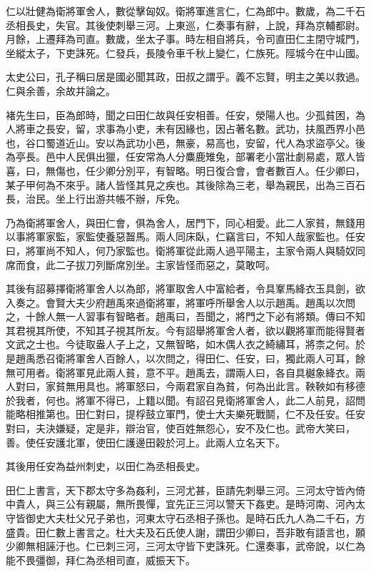 仁以壯健為衛將軍舍人，數從擊匈奴。衛將軍進言仁，仁為郎中。數歲，為二千石丞相長史，失官。其後使刺舉三河。上東巡，仁奏事有辭，上說，拜為京輔都尉。月餘，上遷拜為司直。數歲，坐太子事。時左相自將兵，令司直田仁主閉守城門，坐縱太子，下吏誅死。仁發兵，長陵令車千秋上變仁，仁族死。陘城今在中山國。

太史公曰，孔子稱曰居是國必聞其政，田叔之謂乎。義不忘賢，明主之美以救過。仁與余善，余故并論之。

褚先生曰，臣為郎時，聞之曰田仁故與任安相善。任安，滎陽人也。少孤貧困，為人將車之長安，留，求事為小吏，未有因緣也，因占著名數。武功，扶風西界小邑也，谷口蜀道近山。安以為武功小邑，無豪，易高也，安留，代人為求盜亭父。後為亭長。邑中人民俱出獵，任安常為人分麋鹿雉兔，部署老小當壯劇易處，眾人皆喜，曰，無傷也，任少卿分別平，有智略。明日復合會，會者數百人。任少卿曰，某子甲何為不來乎。諸人皆怪其見之疾也。其後除為三老，舉為親民，出為三百石長，治民。坐上行出游共帳不辦，斥免。

乃為衛將軍舍人，與田仁會，俱為舍人，居門下，同心相愛。此二人家貧，無錢用以事將軍家監，家監使養惡齧馬。兩人同床臥，仁竊言曰，不知人哉家監也。任安曰，將軍尚不知人，何乃家監也。衛將軍從此兩人過平陽主，主家令兩人與騎奴同席而食，此二子拔刀列斷席別坐。主家皆怪而惡之，莫敢呵。

其後有詔募擇衛將軍舍人以為郎，將軍取舍人中富給者，令具鞌馬絳衣玉具劍，欲入奏之。會賢大夫少府趙禹來過衛將軍，將軍呼所舉舍人以示趙禹。趙禹以次問之，十餘人無一人習事有智略者。趙禹曰，吾聞之，將門之下必有將類。傳曰不知其君視其所使，不知其子視其所友。今有詔舉將軍舍人者，欲以觀將軍而能得賢者文武之士也。今徒取盎人子上之，又無智略，如木偶人衣之綺繡耳，將柰之何。於是趙禹悉召衛將軍舍人百餘人，以次問之，得田仁、任安，曰，獨此兩人可耳，餘無可用者。衛將軍見此兩人貧，意不平。趙禹去，謂兩人曰，各自具樾象絳衣。兩人對曰，家貧無用具也。將軍怒曰，今兩君家自為貧，何為出此言。鞅鞅如有移德於我者，何也。將軍不得已，上籍以聞。有詔召見衛將軍舍人，此二人前見，詔問能略相推第也。田仁對曰，提桴鼓立軍門，使士大夫樂死戰鬬，仁不及任安。任安對曰，夫決嫌疑，定是非，辯治官，使百姓無怨心，安不及仁也。武帝大笑曰，善。使任安護北軍，使田仁護邊田穀於河上。此兩人立名天下。

其後用任安為益州刺史，以田仁為丞相長史。

田仁上書言，天下郡太守多為姦利，三河尤甚，臣請先刺舉三河。三河太守皆內倚中貴人，與三公有親屬，無所畏憚，宜先正三河以警天下姦吏。是時河南、河內太守皆御史大夫杜父兄子弟也，河東太守石丞相子孫也。是時石氏九人為二千石，方盛貴。田仁數上書言之。杜大夫及石氏使人謝，謂田少卿曰，吾非敢有語言也，願少卿無相誣汙也。仁已刺三河，三河太守皆下吏誅死。仁還奏事，武帝說，以仁為能不畏彊御，拜仁為丞相司直，威振天下。

